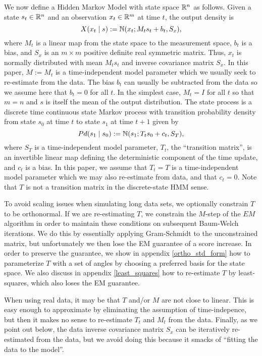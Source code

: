 \documentclass[12pt,leqno]{article}
\begin{document}
We now define a Hidden Markov Model with state space ${\mathbb R}^n$ as follows.  Given a state $s_t\in{\mathbb R}^n$ and an observation $x_t\in{\mathbb R}^m$ at time $t$, the output density is
$$
X(x_t\mid s) := {\mathbb N}(x_t;M_ts_t + b_t,S_x),
$$
where $M_t$ is a linear map from the state space to the
measurement space, $b_t$ is a bias, and $S_x$ is an $m\times{m}$ positive definite real symmetric matrix.  Thus, $x_t$
is normally distributed with mean $M_ts_t$ and inverse covariance matrix $S_x$.  In this paper, $M := M_t$ is a
time-independent model parameter which we usually seek to re-estimate from the data.  The bias $b_t$ can
usually be subtracted from the data so we assume here that $b_t = 0$ for all $t$.  
In the simplest case, $M_t = I$ for all $t$ so that $m = n$ and $s$ is itself the mean of the output distribution.  
The state process is a discrete time continuous state Markov process with transition probability density
from state $s_0$ at time $t$ to state $s_1$ at time $t+1$ given by
$$
Pd(s_1\mid s_0) :=  {\mathbb N}(s_1;T_ts_0+c_t,S_T),
$$
where $S_T$ is a time-independent model parameter, $T_t$, the ``transition matrix'', is an invertible linear map  
defining the deterministic component of the time update, and $c_t$ is a bias.  In this paper, we assume that
$T_t = T$ is a time-independent model parameter which we may
also re-estimate from data, and that $c_t = 0$.  Note that $T$ is not a transition matrix in the
discrete-state HMM sense.

To avoid scaling issues when simulating long data sets, we optionally constrain $T$ to be orthonormal.
If we are re-estimating $T$, we constrain the $M$-step of the $EM$ algorithm in order to maintain these
conditions on subsequent Baum-Welch iterations.  We do this by essentially applying Gram-Schmidt to the
unconstrained matrix, but unfortunately we then lose the EM guarantee of a score increase.   In order to preserve the
guarantee, we show in appendix \ref{ortho_std_form} how to parameterize $T$ with a set of angles by choosing
a preferred basis for the state space.  We also discuss in appendix \ref{least_squares} how to re-estimate $T$ by
least-squares, which also loses the EM guarantee.

When using real data, it may be that  $T$ and/or $M$ are not close to linear.  This is easy enough to approximate
by eliminating the assumption of time-indepence, but then it makes no sense to re-estimate $T_t$ and $M_t$ from the
data.  Finally, as we point out below, the data inverse covariance matrix $S_x$ can be iteratively re-estimated from
the data,  but we avoid doing this because  it smacks of ``fitting the data to the model''.
\end{document}
